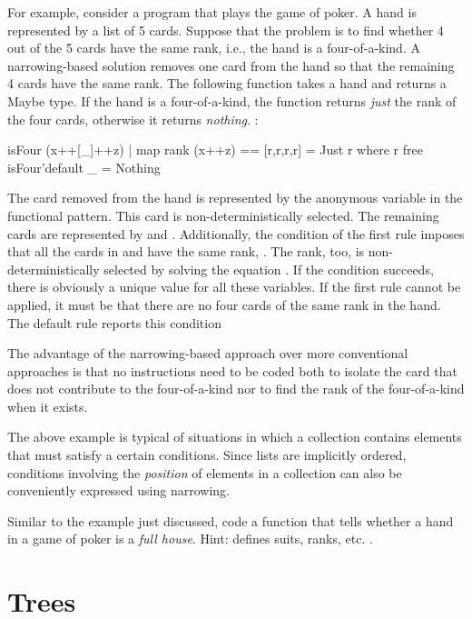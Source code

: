 For example, consider a program that plays the game of poker.
A hand is represented by a list of 5 cards.
Suppose that the problem is to find whether 4 out of the 5 cards
have the same rank, i.e., the hand is a four-of-a-kind.
A narrowing-based solution removes one card from the hand
so that the remaining 4 cards have the same rank.
The following function takes a hand and returns a Maybe type.
If the hand is a four-of-a-kind, the function returns \emph{just}
the rank of the four cards, otherwise it returns \emph{nothing}.
:
%
\begin{prog}
isFour (x++[_]++z) | map rank (x++z) == [r,r,r,r] = Just r where r free
isFour'default _ = Nothing
\end{prog}
%
The card removed from the hand is represented by the anonymous
variable in the functional pattern.
This card is non-deterministically selected.
The remaining cards are represented by  and .
Additionally, the condition of the first rule imposes that
all the cards in  and 
have the same rank, .
The rank, too, is non-deterministically selected by solving
the equation .
If the condition succeeds, there is obviously a unique
value for all these variables.
If the first rule cannot be applied, it must be that
there are no four cards of the same rank in the hand.
The default rule reports this condition

The advantage of the narrowing-based approach
over more conventional approaches is that no instructions need to
be coded both to isolate the card that does not contribute to
the four-of-a-kind nor to find the rank of the four-of-a-kind
when it exists.

The above example is typical of situations in which a collection
contains elements that must satisfy a certain conditions.
Since lists are implicitly ordered, conditions involving
the \emph{position} of elements in a collection can also be
conveniently expressed using narrowing.

\begin{exercise}
Similar to the example just discussed, code a function
that tells whether a hand in a game of poker is a
\emph{full house}.
Hint: 
defines suits, ranks, etc.
.
\end{exercise}

\section{Trees}


